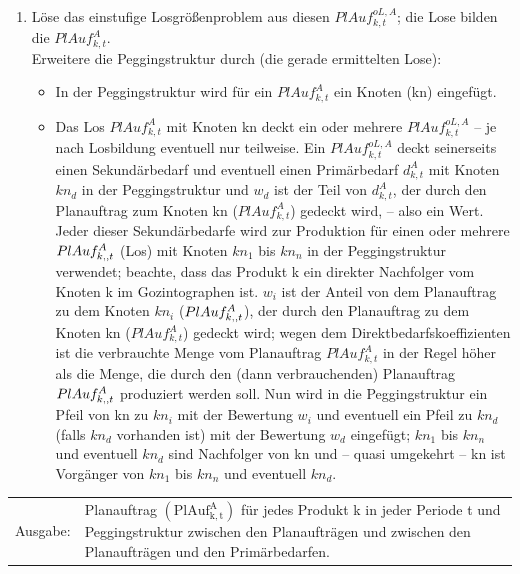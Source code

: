 \documentclass[13pt,a4paper, listof=entryprefix, bibliography=totocnumbered,toc=listofnumbered,lof=listofnumbered]{scrartcl}
\begin{document}
\begin{algorithmic}
\begin{itemize} [leftmargin=*]
\begin{enumerate} [leftmargin=1.5em, label=]
\begin{enumerate} [leftmargin=*, label= \arabic*.]
				            \item
				                  Löse das einstufige Losgrößenproblem aus diesen $PlAuf^{oL,A}_{k,t}$; die Lose bilden die $PlAuf^{A}_{k,t}$. \\
				                  Erweitere die Peggingstruktur durch (die gerade ermittelten Lose):
				                  \begin{itemize} [leftmargin=*]
					                  \item
					                        In der Peggingstruktur wird für ein $PlAuf^{A}_{k,t}$ ein Knoten (kn) eingefügt. \\
					                  \item
					                        Das Los $PlAuf^{A}_{k,t}$ mit Knoten kn deckt ein oder mehrere $PlAuf^{oL,A}_{k,t}$ -- je nach Losbildung eventuell nur teilweise. Ein $PlAuf^{oL,A}_{k,t}$ deckt seinerseits einen Sekundärbedarf und eventuell einen Primärbedarf $d^{A}_{k,t}$ mit Knoten $kn_d$ in der Peggingstruktur und $w_d$ ist der Teil von $d^{A}_{k,t}$, der durch den Planauftrag zum Knoten kn ($PlAuf^{A}_{k,t}$) gedeckt wird, -- also ein Wert. Jeder dieser Sekundärbedarfe wird zur Produktion für einen oder mehrere $PlAuf^{A}_{k\textsc{\char13},t}$ (Los) mit Knoten $kn_1$ bis $kn_n$ in der Peggingstruktur verwendet; beachte, dass das Produkt k\textsc{} ein direkter Nachfolger vom Knoten k im Gozintographen ist. $w_i$ ist der Anteil von dem Planauftrag zu dem Knoten $kn_i$ ($PlAuf^{A}_{k\textsc{\char13},t}$), der durch den Planauftrag zu dem Knoten kn ($PlAuf^{A}_{k,t}$) gedeckt wird; wegen dem Direktbedarfskoeffizienten ist die verbrauchte Menge vom Planauftrag $PlAuf^{A}_{k,t}$ in der Regel höher als die Menge, die durch den (dann verbrauchenden) Planauftrag $PlAuf^{A}_{k\textsc{\char13},t}$ produziert werden soll. Nun wird in die Peggingstruktur ein Pfeil von kn zu $kn_i$ mit der Bewertung $w_i$ und eventuell ein Pfeil zu $kn_d$ (falls $kn_d$ vorhanden ist) mit der Bewertung $w_d$ eingefügt; $kn_1$ bis $kn_n$ und eventuell $kn_d$ sind Nachfolger von kn und -- quasi umgekehrt -- kn ist Vorgänger von $kn_1$ bis $kn_n$ und eventuell $kn_d$.
				                  \end{itemize}

			            \end{enumerate}

		      \end{enumerate}

	\end{itemize}



	\begin{tabularx}{\linewidth}{p{1.5 cm}X}
		Ausgabe: & Planauftrag $(\mathrm{PlAuf^{A}_{k,t}})$ für jedes Produkt k in jeder Periode t und Peggingstruktur zwischen den Planaufträgen und zwischen den Planaufträgen und den Primärbedarfen.
	\end{tabularx}
	\addtocounter{table}{-1} %
\end{algorithmic}
\end{document}

